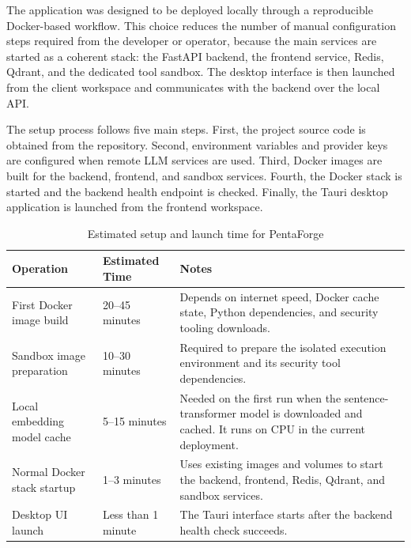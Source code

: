 \documentclass[12pt,a4paper]{report}
\begin{document}
The application was designed to be deployed locally through a reproducible
Docker-based workflow. This choice reduces the number of manual configuration steps
required from the developer or operator, because the main services are started as a
coherent stack: the FastAPI backend, the frontend service, Redis, Qdrant, and the
dedicated tool sandbox. The desktop interface is then launched from the client
workspace and communicates with the backend over the local API.

The setup process follows five main steps. First, the project source code is obtained
from the repository. Second, environment variables and provider keys are configured
when remote LLM services are used. Third, Docker images are built for the backend,
frontend, and sandbox services. Fourth, the Docker stack is started and the backend
health endpoint is checked. Finally, the Tauri desktop application is launched from
the frontend workspace.

\begin{table}[H]
    \centering
    \caption{Estimated setup and launch time for PentaForge}
    \label{tab:setup_time}
    \renewcommand{\arraystretch}{1.35}
    \begin{tabular}{|p{}|p{}|p{}|}
        \hline
        \textbf{Operation} & \textbf{Estimated Time} & \textbf{Notes} \\
        \hline
        First Docker image build & 20--45 minutes & Depends on internet speed,
        Docker cache state, Python dependencies, and security tooling downloads. \\
        \hline
        Sandbox image preparation & 10--30 minutes & Required to prepare the isolated
        execution environment and its security tool dependencies. \\
        \hline
        Local embedding model cache & 5--15 minutes & Needed on the first run when
        the sentence-transformer model is downloaded and cached. It runs on CPU in the
        current deployment. \\
        \hline
        Normal Docker stack startup & 1--3 minutes & Uses existing images and volumes
        to start the backend, frontend, Redis, Qdrant, and sandbox services. \\
        \hline
        Desktop UI launch & Less than 1 minute & The Tauri interface starts after the
        backend health check succeeds. \\
        \hline
    \end{tabular}
\end{table}
\end{document}
